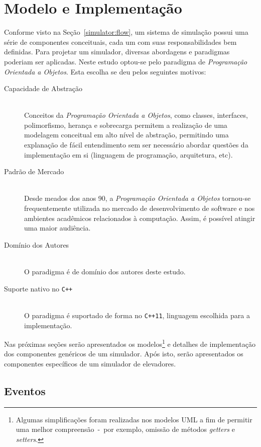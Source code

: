 \chapter{\label{chap:model}Modelo e Implementação}

Conforme visto na Seção~\ref{simulator:flow}, um sistema de simulação possui uma
série de componentes conceituais, cada um com suas responsabilidades bem
definidas. Para projetar um simulador, diversas abordagens e paradigmas poderiam
ser aplicadas. Neste estudo optou-se pelo paradigma de \textit{Programação
Orientada a Objetos}. Esta escolha se deu pelos seguintes motivos:

\begin{description}
  \item[Capacidade de Abstração]\hfill \\
    Conceitos da \textit{Programação Orientada a Objetos}, como classes,
    interfaces, polimorfismo, herança e sobrecarga permitem a realização de uma
    modelagem conceitual em alto nível de abstração, permitindo uma explanação
    de fácil entendimento sem ser necessário abordar questões da implementação
    em si (linguagem de programação, arquitetura, etc).
  \item[Padrão de Mercado]\hfill \\
    Desde meados dos anos 90, a \textit{Programação Orientada a Objetos}
    tornou-se frequentemente utilizada no mercado de desenvolvimento de software
    e nos ambientes acadêmicos relacionados à computação. Assim, é possível
    atingir uma maior audiência.
  \item[Domínio dos Autores]\hfill \\
    O paradigma é de domínio dos autores deste estudo.
  \item[Suporte nativo no \texttt{C++}]\hfill \\
    O paradigma é suportado de forma no \texttt{C++11}, linguagem escolhida para
    a implementação.
\end{description}

Nas próximas seções serão apresentados os modelos\footnote{Algumas
simplificações foram realizadas nos modelos UML a fim de permitir uma melhor
compreensão~-~por exemplo, omissão de métodos \textit{getters} e
\textit{setters}.} e detalhes de implementação dos componentes genéricos de um
simulador. Após isto, serão apresentados os componentes específicos de um
simulador de elevadores.

\section{\label{model:events}Eventos}

